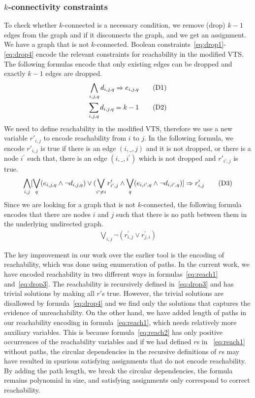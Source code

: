 \subsubsection{$k$-connectivity constraints}
To check whether $k$-connected is a necessary condition, we remove (drop) $k-1$ edges from the graph and if it
disconnects the graph, and we get an assignment. We have a graph that is not  $k$-connected.
%
Boolean constraints~\ref{eq:drop1}-\ref{eq:drop4}
encode the relevant constraints for reachability
in the modified VTS. 
%
The following formulas encode that only
existing edges can be dropped and exactly $k-1$ edges are dropped.
\begin{align}
  \bigwedge\limits_{i,j,q} d_{i,j,q} \Rightarrow e_{i,j,q}  \tag{D1}\label{eq:drop1}\\
  \sum_{i,j,q} d_{i,j,q} = k-1
  \tag{D2}\label{eq:drop2}
\end{align}
We need to define reachability in the modified VTS, therefore we use
a new variable $r'_{i,j}$ to encode reachability from $i$ to $j$.
In the following formula, we encode $r'_{i,j}$ is true if there is an
edge $(i,\_,j)$ and it is not dropped, or there is a node
$i^{\prime}$ such that, there is an edge $(i,\_,i^{\prime})$ which is
not dropped and $r'_{i',j}$ is true.
\begin{align}
\bigwedge\limits_{i,j}  [\bigvee_{q} (e_{i,j,q} \land  \neg d_{i,j,q}) \lor  (\bigvee_{i' \neq i}  r^{\prime}_{i',j} \land  \bigvee_{q} (e_{i,i',q} \land \neg d_{i,i',q}) ] \Rightarrow r^{\prime}_{i,j}  
  \tag{D3}\label{eq:drop3}
\end{align}
Since we are looking for a graph that is not $k$-connected,
the following formula encodes that there are nodes $i$ and $j$ such that
there is no path between them in the underlying undirected graph.
\begin{align}
   \bigvee\limits_{i,j} \neg (r^{\prime}_{i,j} \lor r^{\prime}_{j,i})
  \tag{D4}\label{eq:drop4}
\end{align}

The key improvement in our work over the earlier tool is the
encoding of reachability, which was done using enumeration of paths.
%
In the current work, we have encoded reachability in two different
ways in formulas~\eqref{eq:reach1} and~\eqref{eq:drop3}.
%
The reachability is recursively defined in~\eqref{eq:drop3} and has
trivial solutions by making all $r'$s true.
%
However, the trivial solutions are disallowed by formula~\eqref{eq:drop4} and we find
only the solutions that captures the evidence of unreachability.
%
On the other hand,
we have added length of paths in our reachability encoding in formula~\eqref{eq:reach1},
which needs relatively more auxiliary variables.
%
This is because formula~\eqref{eq:reach2} has only positive
occurrences of the reachability variables and if we had defined
$r$s in ~\eqref{eq:reach1} without paths,
the circular dependencies in the recursive definitions of $r$s
may have resulted in spurious satisfying assignments that
do not encode reachability.
%
By adding the path length, we break the circular dependencies, the
formula remains polynomial in size, and satisfying assignments only
correspond to correct reachability.

